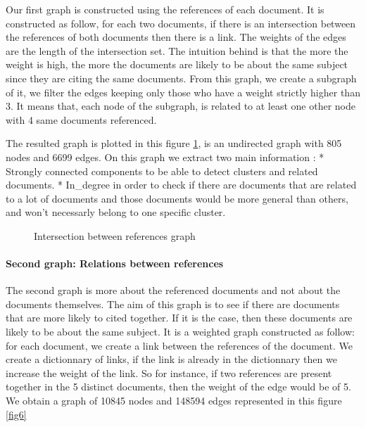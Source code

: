 \documentclass[journal,twocolumn]{IEEEtran}
\begin{document}
Our first graph is constructed using the references of each document. It
is constructed as follow, for each two documents, if there is an
intersection between the references of both documents then there is a
link. The weights of the edges are the length of the intersection set.
The intuition behind is that the more the weight is high, the more the
documents are likely to be about the same subject since they are citing
the same documents. From this graph, we create a subgraph of it, we
filter the edges keeping only those who have a weight strictly higher
than 3. It means that, each node of the subgraph, is related to at least
one other node with 4 same documents referenced.



    The resulted graph is plotted in this figure \ref{intersection}, is an
undirected graph with 805 nodes and 6699 edges. On this graph we extract
two main information : * Strongly connected components to be able to
detect clusters and related documents. * In\_degree in order to check if
there are documents that are related to a lot of documents and those
documents would be more general than others, and won't necessarly belong
to one specific cluster.


    \begin{figure}
        \begin{center}\end{center}
        \caption{Intersection between references graph}
        \label{intersection}
    \end{figure}
    
    \hypertarget{second-graph-relations-between-references}{%
\paragraph{Second graph: Relations between
references}\label{second-graph-relations-between-references}}

The second graph is more about the referenced documents and not about
the documents themselves. The aim of this graph is to see if there are
documents that are more likely to cited together. If it is the case,
then these documents are likely to be about the same subject. It is a
weighted graph constructed as follow: for each document, we create a
link between the references of the document. We create a dictionnary of
links, if the link is already in the dictionnary then we increase the
weight of the link. So for instance, if two references are present
together in the 5 distinct documents, then the weight of the edge would
be of 5. We obtain a graph of 10845 nodes and 148594 edges represented
in this figure \ref{fig6}
\end{document}
